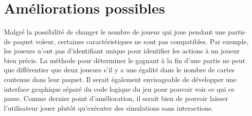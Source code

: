 \documentclass[11pt, french]{article} %
\begin{document}
\section{Améliorations possibles}
\paragraph{}
Malgré la possibilité de changer le nombre de joueur qui joue pendant une partie de paquet voleur, certaines caractéristiques ne sont pas compatibles. Par exemple, les joueurs n'ont pas d'identifiant unique pour identifier les actions à un joueur bien précis. La méthode pour déterminer le gagnant à la fin d'une partie ne peut que différentier que deux joueurs s'il y a une égalité dans le nombre de cartes contenue dans leur paquet. Il serait également envisageable de développer une interface graphique séparé du code logique du jeu pour pouvoir voir ce qui ce passe. Comme dernier point d'amélioration, il serait bien de pouvoir laisser l'utilisateur jouer plutôt qu'exécuter des simulations sans interactions.
\end{document}
